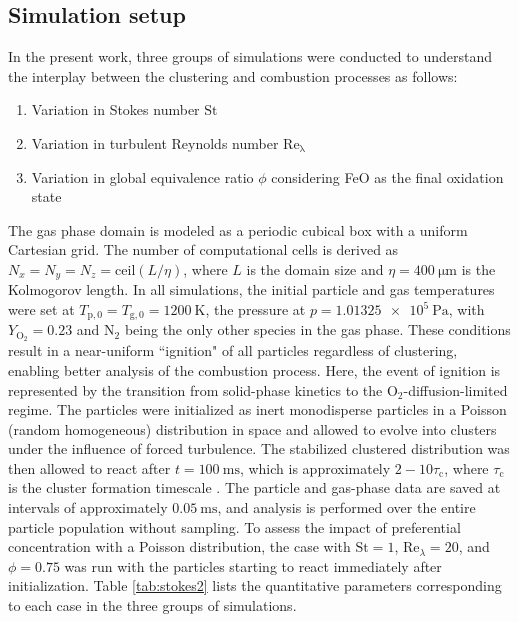 \documentclass[times,twocolumn,final]{elsarticle}
\newcommand{\mrm}[1]{\mathrm{#1}}
\newcommand{\St}{\mathrm{St}}
\newcommand{\Rel}{\mathrm{Re}_\lambda}
\newcommand{\YO}{Y_\mathrm{O_2}}
\newcommand{\green}{\color{ForestGreen}}
\newcommand{\green}{}
\begin{document}
\subsection{Simulation setup}

In the present work, three groups of simulations were conducted to understand the interplay between the clustering and combustion processes as follows:
\begin{enumerate}
\itemsep0em
    \item Variation in Stokes number $\mrm{St}$
    \item Variation in turbulent Reynolds number $\mrm{Re}_\mrm{\lambda}$
    \item Variation in global equivalence ratio $\phi$ considering FeO as the final oxidation state
\end{enumerate}

The gas phase domain is modeled as a periodic cubical box with a uniform Cartesian grid. The number of computational cells is derived as $N_x = N_y = N_z=\mrm{ceil}(L/\eta)$, where $L$ is the domain size and $\eta=\SI{400}{\micro\meter}$ is the Kolmogorov length. In all simulations, the initial particle and gas temperatures were set at $T_\mrm{p,0} = T_\mrm{g,0} = \SI{1200}{\kelvin}$, the pressure at $p=\SI{1.01325e5}{\Pa}$, with $\YO=0.23$ and $\mathrm{N_2}$ being the only other species in the gas phase. These conditions result in a near-uniform ``ignition" of all particles regardless of clustering, enabling better analysis of the combustion process. Here, the event of ignition is represented by the transition from solid-phase kinetics to the $\mrm{O_2}$-diffusion-limited regime. {\green The particles were initialized as inert monodisperse particles in a Poisson (random homogeneous) distribution in space and allowed to evolve into clusters under the influence of forced turbulence.} {\green The stabilized clustered distribution was then allowed to react after $t=\SI{100}{\milli\second}$, which is approximately $2-10\tau_\mrm{c}$, where $\tau_\mrm{c}$ is the cluster formation timescale \cite{hemamalini2025}. The particle and gas-phase data are saved at intervals of approximately $\SI{0.05}{\milli\second}$, and analysis is performed over the entire particle population without sampling.} To assess the impact of preferential concentration with a Poisson distribution, the case with $\St=1$, $\Rel=20$, and $\phi=0.75$ was run with the particles starting to react immediately after initialization. Table \ref{tab:stokes2} lists the quantitative parameters corresponding to each case in the three groups of simulations.
\end{document}

